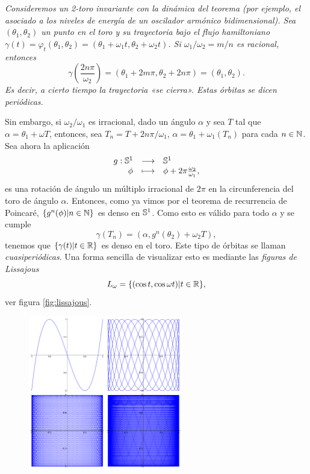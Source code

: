 \begin{obs}
  \em
  Consideremos un 2-toro invariante con la dinámica del teorema (por ejemplo, el asociado a los niveles de energía de un oscilador armónico bidimensional). Sea $(\theta_1,\theta_2)$ un punto en el toro y su trayectoria bajo el flujo hamiltoniano $\gamma(t)=\varphi_t(\theta_1,\theta_2)=(\theta_1+\omega_1t,\theta_2+\omega_2t)$. Si $\omega_1/\omega_2=m/n$ es racional, entonces 
  \begin{equation*}
    \gamma\left(\frac{2n\pi}{\omega_2}\right) = (\theta_1+2m\pi,\theta_2+2n\pi)=(\theta_1,\theta_2).
  \end{equation*}
  Es decir, a cierto tiempo la trayectoria «se cierra». Estas órbitas se dicen \emph{periódicas}. 
 
  Sin embargo, si $\omega_2/\omega_1$ es irracional, dado un ángulo $\alpha$ y sea $T$ tal que $\alpha=\theta_1+\omega T$, entonces, sea $T_n=T+2n\pi/\omega_1$, $\alpha=\theta_1+\omega_1(T_n)$ para cada $n\in \mathbb{N}$. Sea ahora la aplicación
  \begin{equation*}
    \begin{array}{rcl}
    g:\mathbb{S}^1 & \longrightarrow &\mathbb{S}^1 \\
  \phi & \longmapsto & \phi + 2\pi\frac{\omega_2}{\omega_1},
  \end{array}
\end{equation*}
es una rotación de ángulo un múltiplo irracional de $2\pi$ en la circunferencia del toro de ángulo $\alpha$. Entonces, como ya vimos por el teorema de recurrencia de Poincaré, $\{g^n(\phi)|n\in \mathbb{N}\}$ es denso en $\mathbb{S}^1$. Como esto es válido para todo $\alpha$ y se cumple 
\begin{equation*}
  \gamma(T_n)=(\alpha,g^n(\theta_2)+\omega_2 T),
\end{equation*}
tenemos que $\{\gamma(t)|t \in \mathbb{R} \}$ es denso en el toro. Este tipo de órbitas se llaman \emph{cuasiperiódicas}. Una forma sencilla de visualizar esto es mediante las \emph{figuras de Lissajous} 
\begin{equation*}
  L_{\omega}=\{(\cos t, \cos \omega t) | t \in \mathbb{R}\},
\end{equation*}
ver figura \ref{fig:lissajous}.
\begin{figure}[h]
  \centering
  \includegraphics[width=0.6\textwidth]{pics/lissajous}

\end{figure}
\end{obs}
